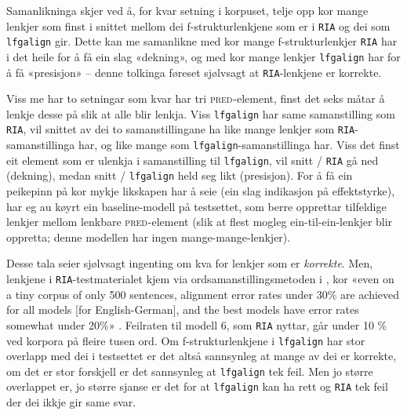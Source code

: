 \documentclass[12pt,a4paper,oneside,draft]{report}
\newcommand{\F}[2]{\textsc{#1}\ensuremath{_{#2}}}
\newcommand{\PRED}{\F{pred}{}}
\begin{document}
Samanlikninga skjer ved å, for kvar setning i korpuset, telje opp kor
 mange lenkjer som finst i snittet mellom dei f-strukturlenkjene som
 er i \texttt{RIA} og dei som \texttt{lfgalign} gir. Dette kan me samanlikne med kor
 mange f-strukturlenkjer \texttt{RIA} har i det heile for å få ein slag
 «dekning», og med kor mange lenkjer \texttt{lfgalign} har for å få
 «presisjon» -- denne tolkinga føreset sjølvsagt at \texttt{RIA}-lenkjene er
 korrekte.

Viss me har to setningar som kvar har tri \PRED{}-element, finst det
 seks måtar å lenkje desse på slik at alle blir lenkja. Viss
 \texttt{lfgalign} har same samanstilling som \texttt{RIA}, vil snittet av dei to
 samanstillingane ha like mange lenkjer som \texttt{RIA}-samanstillinga har,
 og like mange som \texttt{lfgalign}-samanstillinga har. Viss det finst eit
 element som er ulenkja i samanstilling til \texttt{lfgalign}, vil snitt /
 \texttt{RIA} gå ned (dekning), medan snitt / \texttt{lfgalign} held seg likt
 (presisjon). For å få ein peikepinn på kor mykje likskapen har å seie
 (ein slag indikasjon på effektstyrke), har eg au køyrt ein
 baseline-modell på testsettet, som berre opprettar tilfeldige lenkjer
 mellom lenkbare \PRED{}-element (slik at flest mogleg
 ein-til-ein-lenkjer blir oppretta; denne modellen har ingen
 mange-mange-lenkjer).

Desse tala seier sjølvsagt ingenting om kva for lenkjer som er
 \emph{korrekte}. Men, lenkjene i \texttt{RIA}-testmaterialet kjem via
 ordsamanstillingsmetoden i \citet{och2003scv}, kor «even on a tiny
 corpus of only 500 sentences, alignment error rates under 30\% are
 achieved for all models [for English-German], and the best models
 have error rates somewhat under 20\%»
 \citep[s.~36]{och2003scv}. Feilraten til modell 6, som \texttt{RIA} nyttar,
 går under 10 \% ved korpora på fleire tusen ord. Om f-strukturlenkjene
 i \texttt{lfgalign} har stor overlapp med dei i testsettet er det altså
 sannsynleg at mange av dei er korrekte, om det er stor forskjell er
 det sannsynleg at \texttt{lfgalign} tek feil. Men jo større overlappet er,
 jo større sjanse er det for at \texttt{lfgalign} kan ha rett og \texttt{RIA} tek
 feil der dei ikkje gir same svar.
\end{document}
